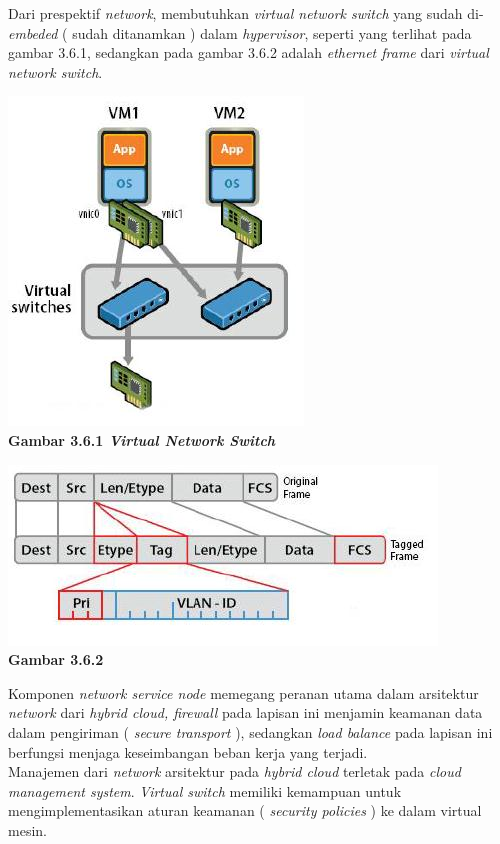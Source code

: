 \tab Dari prespektif \textit{network}, membutuhkan \textit{virtual network switch} yang sudah di-\textit{embeded} ( sudah ditanamkan ) dalam \textit{hypervisor}, seperti yang terlihat pada gambar 3.6.1, sedangkan pada gambar 3.6.2 adalah \textit{ethernet frame} dari \textit{virtual network switch}.\\
\begin{center}
\includegraphics[scale=1]{Gambar361.jpg}\\
\textbf{Gambar 3.6.1 \textit{Virtual Network Switch}}
\end{center}
\begin{center}
\includegraphics[scale=1]{Gambar362.jpg}\\
\textbf{Gambar 3.6.2}
\end{center}
\tab Komponen \textit{network service node} memegang peranan utama dalam arsitektur \textit{network} dari \textit{hybrid cloud, firewall} pada lapisan ini menjamin keamanan data dalam pengiriman ( \textit{secure transport} ), sedangkan \textit{load balance} pada lapisan ini berfungsi menjaga keseimbangan beban kerja yang terjadi.\\
\tab Manajemen dari \textit{network} arsitektur pada \textit{hybrid cloud} terletak pada \textit{cloud management system}. \textit{Virtual switch} memiliki kemampuan untuk mengimplementasikan aturan keamanan ( \textit{security policies }) ke dalam virtual mesin.\\

